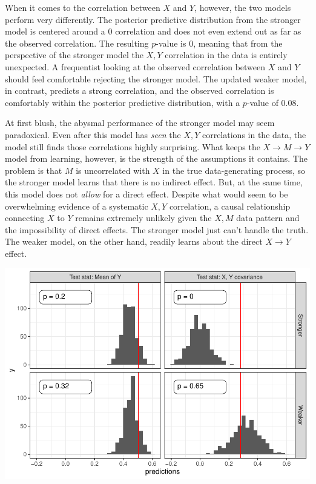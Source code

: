 \documentclass[
  12pt,
]{book}
\begin{document}
When it comes to the correlation between \(X\) and \(Y\), however, the two models perform very differently. The posterior predictive distribution from the stronger model is centered around a \(0\) correlation and does not even extend out as far as the observed correlation. The resulting \(p\)-value is 0, meaning that from the perspective of the stronger model the \(X,Y\) correlation in the data is entirely unexpected. A frequentist looking at the observed correlation between \(X\) and \(Y\) should feel comfortable rejecting the stronger model. The updated weaker model, in contrast, predicts a strong correlation, and the observed correlation is comfortably within the posterior predictive distribution, with a \(p\)-value of 0.08.

At first blush, the abysmal performance of the stronger model may seem paradoxical. Even after this model has \emph{seen} the \(X,Y\) correlations in the data, the model still finds those correlations highly surprising. What keeps the \(X \rightarrow M \rightarrow Y\) model from learning, however, is the strength of the assumptions it contains. The problem is that \(M\) is uncorrelated with \(X\) in the true data-generating process, so the stronger model learns that there is no indirect effect. But, at the same time, this model does not \emph{allow} for a direct effect. Despite what would seem to be overwhelming evidence of a systematic \(X,Y\) correlation, a causal relationship connecting \(X\) to \(Y\) remains extremely unlikely given the \(X,M\) data pattern and the impossibility of direct effects. The stronger model just can't handle the truth. The weaker model, on the other hand, readily learns about the direct \(X \rightarrow Y\) effect.

\includegraphics{ii_files/figure-latex/ch15simulations-1.pdf}
\end{document}
